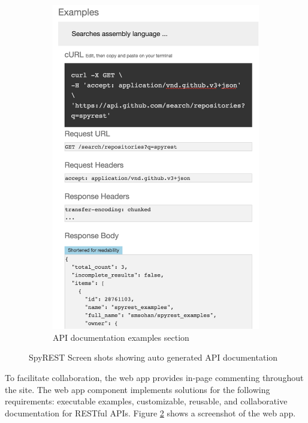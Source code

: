 \documentclass[11pt,oneside]{book}
\begin{document}
\begin{figure}[!tbh]
\begin{mdframed}
\begin{subfigure}[t]{0.45\textwidth}
      \includegraphics[width=\linewidth]{right.png}
      \caption{API documentation examples section}
      \label{fig:examples}
    \end{subfigure}
    \caption{SpyREST Screen shots showing auto generated API documentation}
    \label{fig:spyrest_screenshots}
  \end{mdframed}
\end{figure}

To facilitate collaboration, the web app provides in-page commenting throughout the site. The web app component implements solutions for the following requirements: executable examples, customizable, reusable, and collaborative documentation for RESTful APIs. Figure \ref{fig:spyrest_screenshots} shows a screenshot of the web app.
\end{document}
